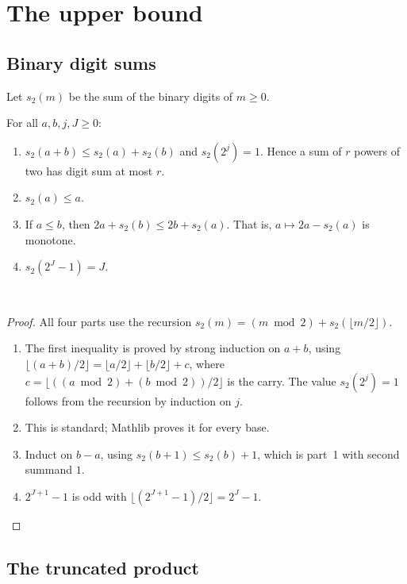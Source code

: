 \section{The upper bound}\label{sec:upper}

\subsection{Binary digit sums}

Let \(s_2(m)\) be the sum of the binary digits of \(m\ge0\).

\begin{lemma}\label{lem:digits}
For all \(a,b,j,J\ge0\):
\begin{enumerate}
 \item \(s_2(a+b)\le s_2(a)+s_2(b)\) and \(s_2(2^j)=1\). Hence a sum of \(r\)
 powers of two has digit sum at most \(r\).
 \item \(s_2(a)\le a\).
 \item If \(a\le b\), then \(2a+s_2(b)\le2b+s_2(a)\). That is,
 \(a\mapsto2a-s_2(a)\) is monotone.
 \item \(s_2(2^J-1)=J\).
\end{enumerate}
\textnormal{\small{}\,}
\end{lemma}

\begin{proof}
All four parts use the recursion \(s_2(m)=(m\bmod2)+s_2(\lfloor m/2\rfloor)\).
\begin{enumerate}
 \item The first inequality is proved by strong induction on \(a+b\), using
 \(\lfloor(a+b)/2\rfloor=\lfloor a/2\rfloor+\lfloor b/2\rfloor+c\), where
 \(c=\lfloor((a\bmod2)+(b\bmod2))/2\rfloor\) is the carry. The value
 \(s_2(2^j)=1\) follows from the recursion by induction on \(j\).
 \item This is standard; Mathlib proves it for every base.
 \item Induct on \(b-a\), using \(s_2(b+1)\le s_2(b)+1\), which is part~1 with
 second summand \(1\).
 \item \(2^{J+1}-1\) is odd with \(\lfloor(2^{J+1}-1)/2\rfloor=2^J-1\). \qedhere
\end{enumerate}
\end{proof}

\subsection{The truncated product}

